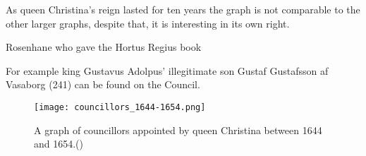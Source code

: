 As queen Christina's reign lasted for ten years the graph is not comparable to the other larger graphs, despite that, it is interesting in its own right. 

Rosenhane who gave the Hortus Regius book

For example king Gustavus Adolpus' illegitimate son Gustaf Gustafsson af Vasaborg (241) can be found on the Council. 
\begin{figure}
	\texttt{[image: councillors\_1644-1654.png]}
	\caption[Councillors appointed by queen Christina]{A graph of councillors appointed by queen Christina between 1644 and 1654.(\cite{councillorsDS})} 
	\centering
\end{figure}

